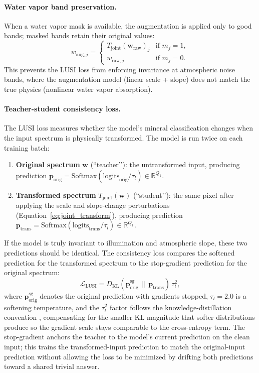 \documentclass[11pt]{report}
\newcommand{\R}{\mathbb{R}}
\begin{document}
\paragraph{Water vapor band preservation.}
When a water vapor mask is available, the augmentation is applied only to good bands; masked bands retain their original values:
\begin{equation}
w_{\text{aug},j} = \begin{cases}
T_{\text{joint}}(\mathbf{w}_{\text{raw}})_j & \text{if } m_j = 1, \\
w_{\text{raw},j} & \text{if } m_j = 0.
\end{cases}
\label{eq:lusi_wv_preserve}
\end{equation}
This prevents the LUSI loss from enforcing invariance at atmospheric noise bands, where the augmentation model (linear scale + slope) does not match the true physics (nonlinear water vapor absorption).

\paragraph{Teacher-student consistency loss.}
The LUSI loss measures whether the model’s mineral classification changes when the input spectrum is physically transformed. The model is run twice on each training batch:
\begin{enumerate}[nosep]
  \item \textbf{Original spectrum} $\mathbf{w}$ (``teacher’’): the untransformed input, producing prediction $\mathbf{p}_{\text{orig}} = \text{Softmax}(\text{logits}_{\text{orig}} / \tau_l) \in \R^{Q_1}$.
  \item \textbf{Transformed spectrum} $T_{\text{joint}}(\mathbf{w})$ (``student’’): the same pixel after applying the scale and slope-change perturbations (Equation~\ref{eq:joint_transform}), producing prediction $\mathbf{p}_{\text{trans}} = \text{Softmax}(\text{logits}_{\text{trans}} / \tau_l) \in \R^{Q_1}$.
\end{enumerate}
If the model is truly invariant to illumination and atmospheric slope, these two predictions should be identical. The consistency loss compares the softened prediction for the transformed spectrum to the stop-gradient prediction for the original spectrum:
\begin{equation}
\mathcal{L}_{\text{LUSI}} =
D_{\text{KL}}\!\left(
\mathbf{p}_{\text{orig}}^{\mathrm{sg}}
\,\|\,
\mathbf{p}_{\text{trans}}
\right)\,\tau_l^{2},
\label{eq:lusi_kl}
\end{equation}
where $\mathbf{p}_{\text{orig}}^{\mathrm{sg}}$ denotes the original prediction with gradients stopped, $\tau_l = 2.0$ is a softening temperature, and the $\tau_l^{2}$ factor follows the knowledge-distillation convention \cite{hinton2015distilling}, compensating for the smaller KL magnitude that softer distributions produce so the gradient scale stays comparable to the cross-entropy term. The stop-gradient anchors the teacher to the model's current prediction on the clean input; this trains the transformed-input prediction to match the original-input prediction without allowing the loss to be minimized by drifting both predictions toward a shared trivial answer.
\end{document}

